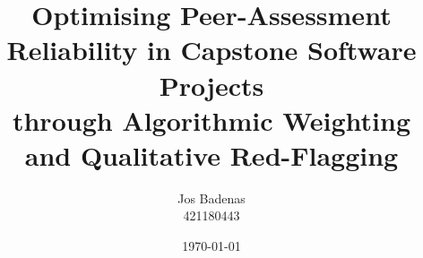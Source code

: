 \documentclass[11pt,a4paper,oneside]{report}
\title{Optimising Peer-Assessment Reliability in Capstone Software Projects\\
  through Algorithmic Weighting and Qualitative Red-Flagging}
\author{Jos Badenas \\ \small 421180443}
\date{\today}
\begin{document}
\maketitle

\begin{abstract}
\end{abstract}

\tableofcontents
\listoffigures
\listoftables

\cleardoublepage
{}












\appendix

\end{document}
